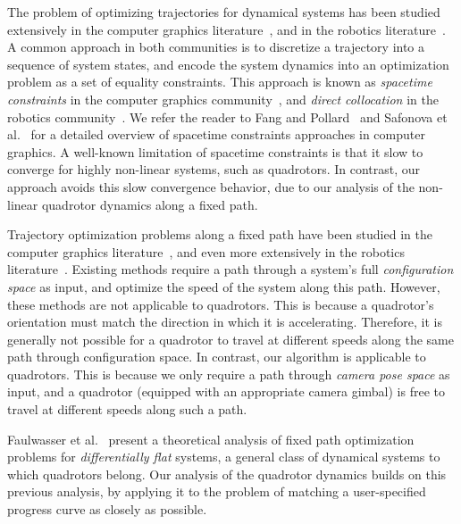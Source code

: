 The problem of optimizing trajectories for dynamical systems has been studied extensively in the computer  graphics literature~\cite{geijtenbeek:2012}, and in the robotics literature~\cite{betts:1998}.
A common approach in both communities is to discretize a trajectory into a sequence of system states, and encode the system dynamics into an optimization problem as a set of equality constraints.
This approach is known as \emph{spacetime constraints} in the computer graphics community~\cite{witkins:1988}, and \emph{direct collocation} in the robotics community~\cite{betts:1998}.
We refer the reader to Fang and Pollard~ and Safonova et al.~ for a detailed overview of spacetime constraints approaches in computer graphics.
A well-known limitation of spacetime constraints is that it slow to converge for highly non-linear systems, such as quadrotors.
In contrast, our approach avoids this slow convergence behavior, due to our analysis of the non-linear quadrotor dynamics along a fixed path.

Trajectory optimization problems along a fixed path have been studied in the computer graphics literature~\cite{mccann:2006}, and even more extensively in the robotics literature~\cite{shin:1985,slotine:1989,dahl:1990,verscheure:2009,lipp:2014}.
Existing methods require a path through a system's full \emph{configuration space} as input, and optimize the speed of the system along this path.
However, these methods are not applicable to quadrotors.
This is because a quadrotor's orientation must match the direction in which it is accelerating.
Therefore, it is generally not possible for a quadrotor to travel at different speeds along the same path through configuration space.
In contrast, our algorithm is applicable to quadrotors.
This is because we only require a path through \emph{camera pose space} as input, and a quadrotor (equipped with an appropriate camera gimbal) is free to travel at different speeds along such a path.

Faulwasser et al.~ present a theoretical analysis of fixed path optimization problems for \emph{differentially flat} systems, a general class of dynamical systems to which quadrotors belong.
Our analysis of the quadrotor dynamics builds on this previous analysis, by applying it to the problem of matching a user-specified progress curve as closely as possible.       
